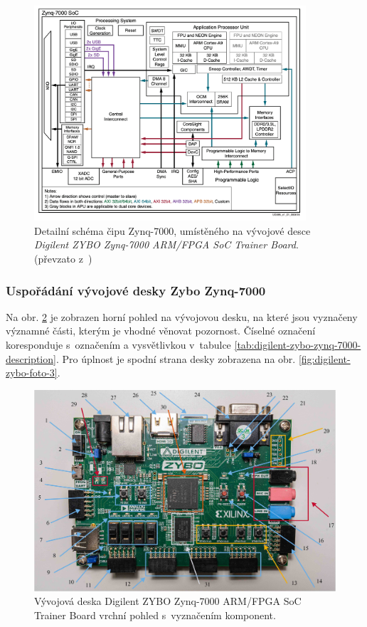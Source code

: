 \documentclass[a4paper, twoside, 11pt]{article}
\newcommand{\fbar}{\FloatBarrier}
\begin{document}
			\begin{figure}[htbp!]
				\centering
					\includegraphics[width=0.90\textwidth]{src/png/zynq-block-diagram-detailed.png} 
					\caption{Detailní schéma čipu Zynq-7000, umístěného na vývojové desce \textit{Digilent ZYBO Zynq-7000 ARM/FPGA SoC Trainer Board}. (převzato z~\cite{xilinx-zynq-7000-technical-reference-manual})}
					\label{fig:zynq-block-diagram-detailed}
			\end{figure}
			\fbar
			\subsubsection{Uspořádání vývojové desky Zybo Zynq-7000}
				Na obr. \ref{fig:digilent-zybo-foto-1-oznacene} je zobrazen horní pohled na vývojovou desku, na které jsou vyznačeny významné části, kterým je vhodné věnovat pozornost. Číselné označení koresponduje s~označením a vysvětlivkou v~tabulce \ref{tab:digilent-zybo-zynq-7000-description}. Pro úplnost je spodní strana desky zobrazena na obr. \ref{fig:digilent-zybo-foto-3}.

				\begin{figure}[H]
					\centering
						\includegraphics[width=1\textwidth]{src/jpg/digilent-zybo-foto-1-oznacene.jpeg} 
						\caption{Vývojová deska Digilent ZYBO Zynq-7000 ARM/FPGA SoC Trainer Board vrchní pohled s~vyznačením komponent.}
						\label{fig:digilent-zybo-foto-1-oznacene}
				\end{figure}
\end{document}
